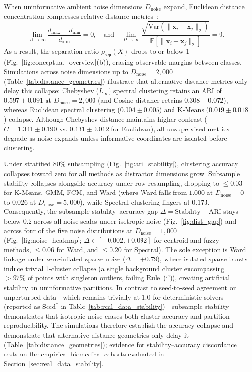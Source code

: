 \documentclass[pdflatex,sn-mathphys-num]{sn-jnl}
\theoremstyle{thmstyleone}
\theoremstyle{thmstyletwo}
\theoremstyle{thmstylethree}
\begin{document}
When uninformative ambient noise dimensions $D_{\text{noise}}$ expand, Euclidean distance concentration compresses relative distance metrics~\cite{beyer1999nearest,peng2024interpreting}:
\begin{equation}\label{eq:dist_concentration}
  \lim_{D \to \infty} \frac{d_{\max} - d_{\min}}{d_{\min}} = 0, \quad \text{and} \quad \lim_{D \to \infty} \frac{\sqrt{\mathrm{Var}(\|\mathbf{x}_i - \mathbf{x}_j\|_2)}}{\mathbb{E}[\|\mathbf{x}_i - \mathbf{x}_j\|_2]} = 0.
\end{equation}
As a result, the separation ratio $\rho_{\text{sep}}(X)$ drops to or below 1 (Fig.~\ref{fig:conceptual_overview}(b)), erasing observable margins between classes. Simulations across noise dimensions up to $D_{\text{noise}}=2{,}000$ (Table~\ref{tab:distance_geometries}) illustrate that alternative distance metrics only delay this collapse: Chebyshev ($L_\infty$) spectral clustering retains an ARI of $0.597 \pm 0.091$ at $D_{\text{noise}}=2{,}000$ (and Cosine distance retains $0.308 \pm 0.072$), whereas Euclidean spectral clustering ($0.004 \pm 0.005$) and K-Means ($0.019 \pm 0.018$) collapse. Although Chebyshev distance maintains higher contrast ($C = 1.341 \pm 0.190$ vs. $0.131 \pm 0.012$ for Euclidean), all unsupervised metrics degrade as noise expands unless informative coordinates are isolated before clustering.



Under stratified 80\% subsampling (Fig.~\ref{fig:ari_stability}), clustering accuracy collapses toward zero for all methods as distractor dimensions grow. Subsample stability collapses alongside accuracy under row resampling, dropping to $\le 0.03$ for K-Means, GMM, FCM, and Ward (where Ward falls from $1.000$ at $D_{\text{noise}}=0$ to $0.026$ at $D_{\text{noise}}=5{,}000$), while Spectral clustering lingers at $0.173$. Consequently, the subsample stability--accuracy gap $\Delta = \text{Stability} - \text{ARI}$ stays below 0.2 across all noise scales under isotropic noise (Fig.~\ref{fig:dist_gap}) and across four of the five noise distributions at $D_{\text{noise}}=1{,}000$ (Fig.~\ref{fig:noise_heatmap}; $\Delta \in [-0.002, +0.092]$ for centroid and fuzzy methods, $\le 0.06$ for Ward, and $\le 0.20$ for Spectral). The sole exception is Ward linkage under zero-inflated sparse noise ($\Delta = +0.79$), where isolated sparse bursts induce trivial 1-cluster collapse (a single background cluster encompassing $> 97\%$ of points with singleton outliers, failing Rule~(i')), creating artificial stability on uninformative partitions. In contrast to seed-to-seed agreement on unperturbed data---which remains trivially at $1.0$ for deterministic solvers (reported as $\text{Seed}^*$ in Table~\ref{tab:real_data_stability})---subsample stability demonstrates that isotropic noise erases both cluster accuracy and partition reproducibility. The simulations therefore establish the accuracy collapse and demonstrate that alternative distance geometries only delay it (Table~\ref{tab:distance_geometries}); evidence for stability--accuracy discordance rests on the empirical biomedical cohorts evaluated in Section~\ref{sec:real_data_stability}.
\end{document}
